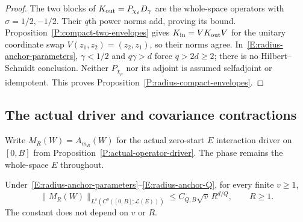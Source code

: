 \begin{proof}
  The two blocks of $K_{\rm out}=P_{\chi_\rho}D_\gamma$
  are the whole-space operators with $\sigma=1/2,-1/2$.
  Their $q$th power norms add, proving its bound.
  Proposition~\ref{P:compact-two-envelopes} gives
  $K_{\rm in}=V K_{\rm out}V$ for the unitary coordinate swap
  $V(z_1,z_2)=(z_2,z_1)$, so their norms agree.
  In~\eqref{E:radius-anchor-parameters}, $\gamma<1/2$ and
  $q\gamma>d$ force $q>2d\ge2$; there is no Hilbert--Schmidt
  conclusion. Neither $P_{\chi_\rho}$ nor its adjoint is assumed
  selfadjoint or idempotent.
  This proves Proposition~\ref{P:radius-compact-envelopes}.
\end{proof}

\subsection{The actual driver and covariance contractions}

Write $M_R(W)=A_{m_R}(W)$ for the actual zero-start $E$ interaction
driver on $[0,B]$ from Proposition~\ref{P:actual-operator-driver}.
The phase remains the whole-space $E$ throughout.

\begin{proposition}
  \label{P:radius-actual-moments}
  Under~\eqref{E:radius-anchor-parameters}--\eqref{E:radius-anchor-Q},
  for every finite $v\ge1$,
  \begin{equation}\label{E:radius-actual-path-moments}
    \|M_R(W)\|_{L^v(C^\theta([0,B];\mathcal L(E)))}
    \le C_{Q,B}\sqrt v\,R^{d/Q},\qquad R\ge1.
  \end{equation}
  The constant does not depend on $v$ or $R$.
\end{proposition}

